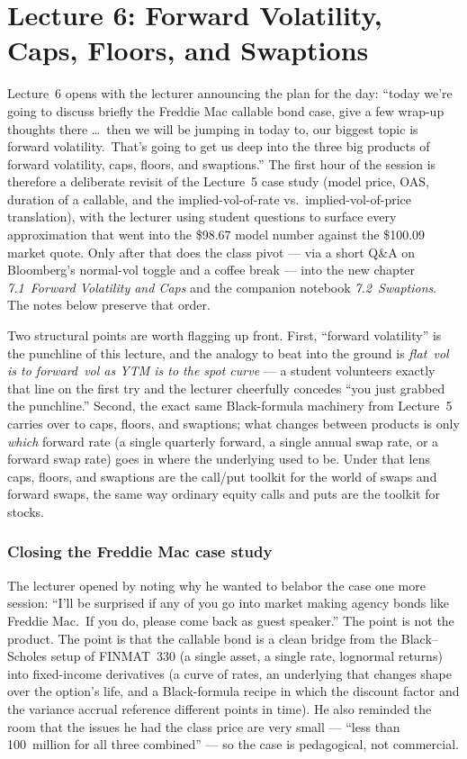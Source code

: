 \part*{Lecture 6: Forward Volatility, Caps, Floors, and Swaptions}

Lecture~6 opens with the lecturer announcing the plan for the day:
``today we're going to discuss briefly the Freddie Mac callable bond
case, give a few wrap-up thoughts there \ldots\ then we will be jumping
in today to, our biggest topic is forward volatility.\ That's going to
get us deep into the three big products of forward volatility, caps,
floors, and swaptions.'' The first hour of the session is therefore a
deliberate revisit of the Lecture~5 case study (model price, OAS,
duration of a callable, and the implied-vol-of-rate vs.\
implied-vol-of-price translation), with the lecturer using student
questions to surface every approximation that went into the
\$98.67 model number against the \$100.09 market quote. Only after
that does the class pivot --- via a short Q\&A on Bloomberg's
normal-vol toggle and a coffee break --- into the new chapter
\emph{7.1~Forward Volatility and Caps} and the companion notebook
\emph{7.2~Swaptions}. The notes below preserve that order.

Two structural points are worth flagging up front. First, ``forward
volatility'' is the punchline of this lecture, and the analogy to
beat into the ground is \emph{flat~vol is to forward~vol as YTM is to
the spot curve} --- a student volunteers exactly that line on the
first try and the lecturer cheerfully concedes ``you just grabbed the
punchline.'' Second, the exact same Black-formula machinery from
Lecture~5 carries over to caps, floors, and swaptions; what changes
between products is only \emph{which} forward rate (a single quarterly
forward, a single annual swap rate, or a forward swap rate) goes in
where the underlying used to be. Under that lens caps, floors, and
swaptions are the call/put toolkit for the world of swaps and forward
swaps, the same way ordinary equity calls and puts are the toolkit
for stocks.

\section{Closing the Freddie Mac case study}\label{L6-sec:freddie}

The lecturer opened by noting why he wanted to belabor the case one
more session: ``I'll be surprised if any of you go into market making
agency bonds like Freddie Mac.\ If you do, please come back as guest
speaker.'' The point is not the product. The point is that the
callable bond is a clean bridge from the Black--Scholes setup of
FINMAT~330 (a single asset, a single rate, lognormal returns) into
fixed-income derivatives (a curve of rates, an underlying that
changes shape over the option's life, and a Black-formula recipe in
which the discount factor and the variance accrual reference different
points in time). He also reminded the room that the issues he had
the class price are very small --- ``less than 100~million for all
three combined'' --- so the case is pedagogical, not commercial.

